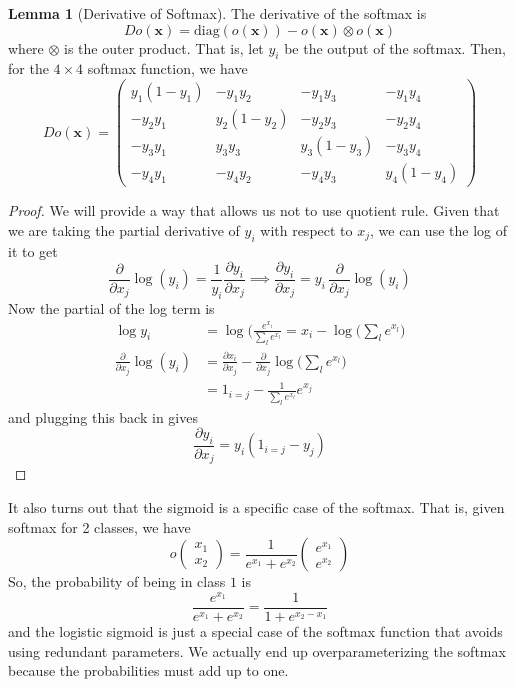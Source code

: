 \documentclass{article}
\theoremstyle{definition}
\newtheorem{lemma}[theorem]{Lemma}
\theoremstyle{remark}
\theoremstyle{definition}
\begin{document}
\begin{lemma}[Derivative of Softmax]
The derivative of the softmax is 
\[D o (\mathbf{x}) = \mathrm{diag}(o (\mathbf{x})) - o (\mathbf{x}) \otimes o (\mathbf{x})\]
where $\otimes$ is the outer product. That is, let $y_i$ be the output of the softmax. Then, for the $4 \times 4$ softmax function, we have 
\[D o(\mathbf{x}) = \begin{pmatrix} y_1 (1 - y_1) & - y_1 y_2 & -y_1 y_3 & - y_1 y_4 \\ -y_2 y_1 & y_2 (1 - y_2) & - y_2 y_3 & - y_2 y_4 \\ -y_3 y_1 & y_3 y_3 & y_3 (1 - y_3) & -y_3 y_4 \\ -y_4 y_1 & -y_4 y_2 & -y_4 y_3 & y_4 (1 - y_4) \end{pmatrix} \]
\end{lemma}
\begin{proof}
We will provide a way that allows us not to use quotient rule. Given that we are taking the partial derivative of $y_i$ with respect to $x_j$, we can use the log of it to get 
\[\frac{\partial}{\partial x_j} \log (y_i) = \frac{1}{y_i} \frac{\partial y_i}{\partial x_j} \implies \frac{\partial y_i}{\partial x_j} = y_i \, \frac{\partial}{\partial x_j} \log(y_i)\]
Now the partial of the log term is 
\begin{align*}
    \log{y_i} & = \log \bigg( \frac{e^{x_i}}{\sum_l e^{x_l}} = x_i - \log \bigg( \sum_l e^{x_l}\bigg) \\
    \frac{\partial}{\partial x_j} \log(y_i) & = \frac{\partial x_i}{\partial x_j} - \frac{\partial}{\partial x_j} \log \bigg( \sum_l e^{x_l}\bigg) \\
    & = 1_{i = j} - \frac{1}{\sum_l e^{x_l}} e^{x_j}
\end{align*}
and plugging this back in gives 
\[\frac{\partial y_i}{\partial x_j} = y_i (1_{i = j} - y_j)\]
\end{proof}

It also turns out that the sigmoid is a specific case of the softmax. That is, given softmax for 2 classes, we have 
\[o\begin{pmatrix} x_1 \\ x_2 \end{pmatrix} = \frac{1}{e^{x_1} + e^{x_2}} \begin{pmatrix} e^{x_1} \\ e^{x_2} \end{pmatrix}\]
So, the probability of being in class $1$ is 
\[\frac{e^{x_1}}{e^{x_1} + e^{x_2}} = \frac{1}{1 + e^{x_2 - x_1}}\]
and the logistic sigmoid is just a special case of the softmax function that avoids using redundant parameters. We actually end up overparameterizing the softmax because the probabilities must add up to one. 
\end{document}
